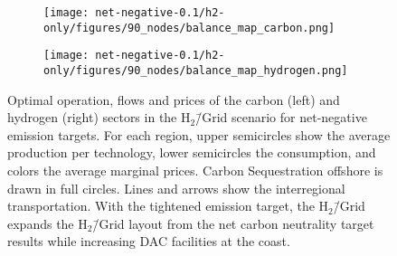\documentclass[twocolumn]{article}
\newcommand{\carbon}{CO$_2$}
\newcommand{\hydrogengrid}{H$_2$\=/Grid}
\newcommand{\hydrogenscenario}{H$_2$\=/Grid scenario}
\newcommand{\hybridscenario}{Hybrid scenario}
\begin{document}
\begin{figure}[ht!]
    \centering
    \begin{subfigure}{.5\textwidth}
        \centering
        \texttt{[image: net-negative-0.1/h2-only/figures/90\_nodes/balance\_map\_carbon.png]}
        \label{fig:balance_map_carbon_h2_nn}
    \end{subfigure}%
    \begin{subfigure}{.5\textwidth}
        \centering
        \texttt{[image: net-negative-0.1/h2-only/figures/90\_nodes/balance\_map\_hydrogen.png]}
        \label{fig:balance_map_hydrogen_h2_nn}
    \end{subfigure}
    \caption{Optimal operation, flows and prices of the carbon (left) and hydrogen (right) sectors in the \hydrogenscenario{} for net-negative emission targets. For each region, upper semicircles show the average production per technology, lower semicircles the consumption, and colors the average marginal prices. Carbon Sequestration offshore is drawn in full circles. Lines and arrows show the interregional transportation. With the tightened emission target, the \hydrogengrid{} expands the \hydrogengrid{} layout from the net carbon neutrality target results while increasing DAC facilities at the coast.
    }
    \label{fig:balance_maps_h2_nn}
\end{figure}






\end{document}
